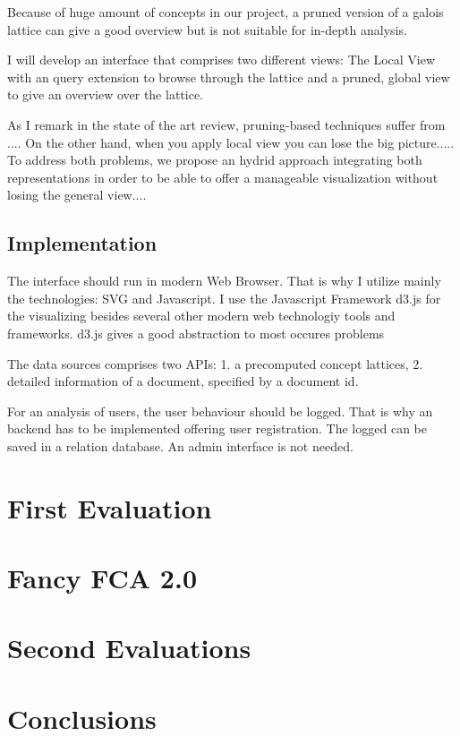 \documentclass[11pt]{article}
\begin{document}
Because of huge amount of concepts in our project, a pruned version of a galois lattice can give a good overview but is not suitable for in-depth analysis.

I will develop an interface that comprises two different views: The Local View with an query extension to browse through the lattice and a pruned, global view to give an overview over the lattice.

As I remark in the state of the art review, pruning-based techniques suffer from .... On the other hand, when you apply local view you can lose the big picture..... To address both problems, we propose an hydrid approach integrating both representations in order to be able to offer a manageable visualization without losing the general view....

\subsection{Implementation}

The interface should run in modern Web Browser. That is why I utilize mainly the technologies: SVG and Javascript. I use the Javascript Framework d3.js for the visualizing besides several other modern web technologiy tools and frameworks. d3.js gives a good abstraction to most occures problems

The data sources comprises two APIs: 1. a precomputed concept lattices, 2. detailed information of a document, specified by a document id.

For an analysis of users, the user behaviour should be logged. That is why an backend has to be implemented  offering user registration. The logged can be saved in a relation database. An admin interface is not needed.

\section{First Evaluation}

\blindtext

\section{Fancy FCA 2.0}

\section{Second Evaluations}

\blindtext

\section{Conclusions}

\blindtext

\newpage



\end{document}
